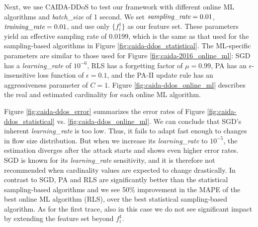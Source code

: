 		Next, we use CAIDA-DDoS to test our framework with different online ML algorithms and \emph{batch\_size} of 1 second. We set $\emph{sampling\_rate} = 0.01$, $\emph{training\_rate} = 0.01$, and use only $\{f_i^1\}$ as our feature set. These parameters yield an effective sampling rate of 0.0199, which is the same as that used for the sampling-based algorithms in Figure \ref{fig:caida-ddos_statistical}. The ML-specific parameters are similar to those used for Figure \ref{fig:caida-2016_online_ml}: SGD has a \emph{learning\_rate} of $10^{-6}$, RLS has a forgetting factor of $\mu=0.99$, PA has an $\epsilon$-insensitive loss function of $\epsilon=0.1$, and the PA-II update rule has an aggressiveness parameter of $C=1$. Figure \ref{fig:caida-ddos_online_ml} describes the real and estimated cardinality for each online ML algorithm. 
		
		Figure \ref{fig:caida-ddos_error} summarizes the error rates of Figure \ref{fig:caida-ddos_statistical} vs. \ref{fig:caida-ddos_online_ml}. We can conclude that SGD's inherent \emph{learning\_rate} is too low. Thus, it fails to adapt fast enough to changes in flow size distribution. But when we increase its \emph{learning\_rate} to $10^{-5}$, the estimation diverges after the attack starts and shows even higher error rates. SGD is known for its \emph{learning\_rate} sensitivity, and it is therefore not recommended when cardinality values are expected to change drastically. In contrast to SGD, PA and RLS are significantly better than the statistical sampling-based algorithms and we see 50\% improvement in the MAPE of the best online ML algorithm (RLS), over the best statistical sampling-based algorithm. As for the first trace, also in this case we do not see significant impact by extending the feature set beyond ${f^1_i}$.
		
